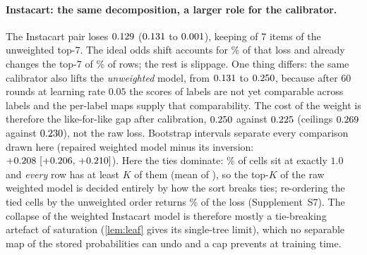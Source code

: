 \documentclass[sigconf,nonacm]{acmart}
\newcommand{\Supp}[1]{Supplement~#1}  %
\begin{document}
\paragraph{Instacart: the same decomposition, a larger role for the calibrator.} The Instacart pair loses $0.129$ ($0.131$ to $0.001$), keeping \nIoverlapS{} of 7 items of the unweighted top-7. The ideal odds shift accounts for \nIoddsShare\% of that loss and already changes the top-7 of \nIfracRowsChangedWhatif\% of rows; the rest is slippage. One thing differs: the same calibrator also lifts the \emph{unweighted} model, from $0.131$ to $0.250$, because after 60 rounds at learning rate $0.05$ the scores of \nInLabels{} labels are not yet comparable across labels and the per-label maps supply that comparability. The cost of the weight is therefore the like-for-like gap after calibration, $0.250$ against $0.225$ (ceilings $0.269$ against $0.230$), not the raw loss. Bootstrap intervals separate every comparison drawn here (repaired weighted model minus its inversion: $+0.208~[+0.206,\,+0.210]$). Here the ties dominate: \nIStieCellsExactOne\% of cells sit at exactly $1.0$ and \emph{every} row has at least $K$ of them (mean \nIStieCellsPerRowMean{} of \nInLabels), so the top-$K$ of the raw weighted model is decided entirely by how the sort breaks ties; re-ordering the tied cells by the unweighted order returns \nItieShareUnw\% of the loss (\Supp{S7}). The collapse of the weighted Instacart model is therefore mostly a tie-breaking artefact of saturation (\cref{lem:leaf} gives its single-tree limit), which no separable map of the stored probabilities can undo and a cap prevents at training time.
\end{document}
